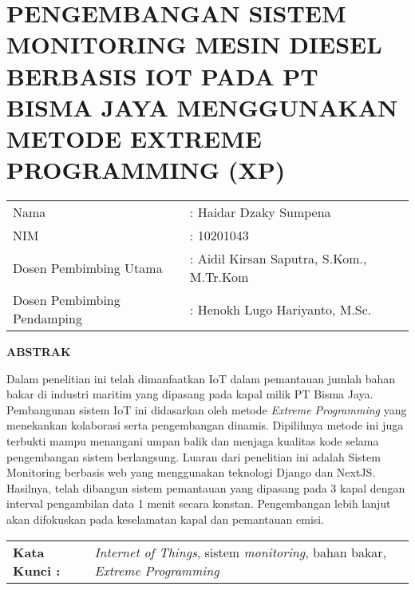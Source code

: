 \chapter*{PENGEMBANGAN SISTEM MONITORING MESIN DIESEL BERBASIS IOT PADA PT BISMA JAYA MENGGUNAKAN METODE EXTREME PROGRAMMING (XP)}
\begin{table}[h]
    \begin{tabular}
        {
            p{}
            p{}
            }
            \\
            Nama & : Haidar Dzaky Sumpena
            \\
            NIM & : 10201043
            \\
            Dosen Pembimbing Utama &
            : Aidil Kirsan Saputra, S.Kom., M.Tr.Kom
            \\
            Dosen Pembimbing Pendamping &
            : Henokh Lugo Hariyanto, M.Sc.
        \end{tabular}
    \end{table}

\begin{center}
    \textbf{ABSTRAK}
\end{center}

Dalam penelitian ini telah dimanfaatkan IoT dalam pemantauan jumlah bahan bakar di industri maritim yang dipasang pada kapal milik PT Bisma Jaya. Pembangunan sistem IoT ini didasarkan oleh metode \textit{Extreme Programming} yang menekankan kolaborasi serta pengembangan dinamis. Dipilihnya metode ini juga terbukti mampu menangani umpan balik dan menjaga kualitas kode selama pengembangan sistem berlangsung. Luaran dari penelitian ini adalah Sistem Monitoring berbasis web yang menggunakan teknologi Django dan NextJS. Hasilnya, telah dibangun sistem pemantauan yang dipasang pada 3 kapal dengan interval pengambilan data 1 menit secara konstan. Pengembangan lebih lanjut akan difokuskan pada keselamatan kapal dan pemantauan emisi.


\begin{table}[h]
    \begin{tabular}{ p{} p{} }
        \\
        \textbf{Kata Kunci :} & \textit{Internet of Things}, sistem \textit{monitoring}, bahan bakar, \textit{Extreme Programming}
    \end{tabular}
\end{table}
